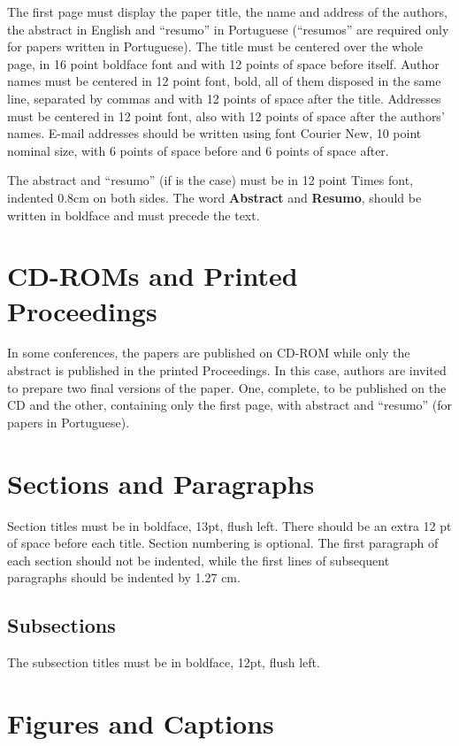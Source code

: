 \documentclass[12pt]{article}
\begin{document}
The first page must display the paper title, the name and address of the
authors, the abstract in English and ``resumo'' in Portuguese (``resumos'' are
required only for papers written in Portuguese). The title must be centered
over the whole page, in 16 point boldface font and with 12 points of space
before itself. Author names must be centered in 12 point font, bold, all of
them disposed in the same line, separated by commas and with 12 points of
space after the title. Addresses must be centered in 12 point font, also with
12 points of space after the authors' names. E-mail addresses should be
written using font Courier New, 10 point nominal size, with 6 points of space
before and 6 points of space after.

The abstract and ``resumo'' (if is the case) must be in 12 point Times font,
indented 0.8cm on both sides. The word \textbf{Abstract} and \textbf{Resumo},
should be written in boldface and must precede the text.

\section{CD-ROMs and Printed Proceedings}

In some conferences, the papers are published on CD-ROM while only the
abstract is published in the printed Proceedings. In this case, authors are
invited to prepare two final versions of the paper. One, complete, to be
published on the CD and the other, containing only the first page, with
abstract and ``resumo'' (for papers in Portuguese).

\section{Sections and Paragraphs}

Section titles must be in boldface, 13pt, flush left. There should be an extra
12 pt of space before each title. Section numbering is optional. The first
paragraph of each section should not be indented, while the first lines of
subsequent paragraphs should be indented by 1.27 cm.

\subsection{Subsections}

The subsection titles must be in boldface, 12pt, flush left.

\section{Figures and Captions}\label{sec:figs}
\end{document}
